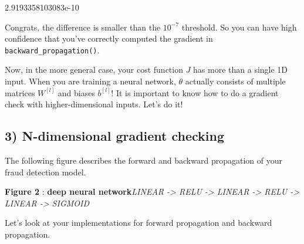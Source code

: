 \documentclass[11pt]{article}
\begin{document}
2.9193358103083e-10

    Congrats, the difference is smaller than the $10^{-7}$ threshold. So you
can have high confidence that you've correctly computed the gradient in
\texttt{backward\_propagation()}.

Now, in the more general case, your cost function $J$ has more than a
single 1D input. When you are training a neural network, $\theta$
actually consists of multiple matrices $W^{[l]}$ and biases $b^{[l]}$!
It is important to know how to do a gradient check with
higher-dimensional inputs. Let's do it!

    \subsection{3) N-dimensional gradient
checking}\label{n-dimensional-gradient-checking}

    The following figure describes the forward and backward propagation of
your fraud detection model.

 \textbf{Figure 2} : \textbf{deep neural network}\emph{LINEAR
-\textgreater{} RELU -\textgreater{} LINEAR -\textgreater{} RELU
-\textgreater{} LINEAR -\textgreater{} SIGMOID}

Let's look at your implementations for forward propagation and backward
propagation.
\end{document}
